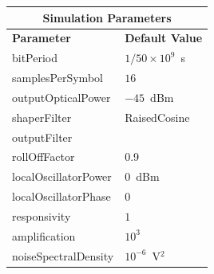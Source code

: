 \begin{table}[H]
	\centering
	\footnotesize
	\begin{tabular}{|l|l|}
		\hline
		\multicolumn{2}{|c|}{ \textbf{Simulation Parameters} } \\
		\hline
		\textbf{Parameter}     & \textbf{Default Value}                                     \\\hline
		bitPeriod              & $1/50\times10^9$~s														\\\hline
		samplesPerSymbol       & $16$                                                       \\\hline
		outputOpticalPower     & $-45$~dBm 													\\ \hline
		shaperFilter	       & RaisedCosine												\\ \hline
		outputFilter		   & 															\\ \hline
		rollOffFactor		   & 0.9														\\ \hline
		localOscillatorPower   & $0$~dBm                                                    \\ \hline
		localOscillatorPhase   & $0$                                                        \\ \hline
		responsivity           & $1$                                                        \\ \hline
		amplification          & $10^3$                                                     \\ \hline
		noiseSpectralDensity   & $10^{-6}$~V$^2$                             					\\ \hline
	\end{tabular}
\end{table}
